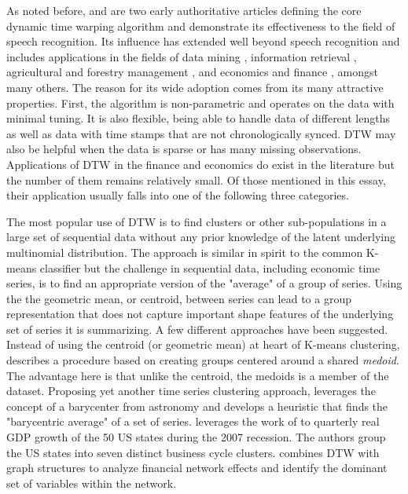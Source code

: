 \documentclass[12pt]{report}
\begin{document}
As noted before, \cite{SakoeChiba_IEEE_1978} and \cite{Itakura_1975} are two early authoritative articles defining the core dynamic time warping algorithm and demonstrate its effectiveness to the field of speech recognition. Its influence has extended well beyond speech recognition and includes applications in the fields of data mining \cite{Berndt1994, ElsingAgon2012, KotsifakosAthitsosPapapetrou_2011}, information retrieval \cite{Mueller2007}, agricultural and forestry management \cite{Chaves_et_all_2021_Brazil_Crop_id, Maus_et_al_2016, NarinO.G.2022URAN, QuXuzhou2023Mmls, XiaoXingyuan2023LCCU}, and economics and finance \cite{9145837_Entropic_DTW_Fin_Networks, Urso_et_al_2021, FrancesWiemann2020, HowardTalisAlexeev_2020, Ito_Sakemoto_2020, Mastroeni_et_al_2021, Raihan2017, WAN2017151, WangXieHanSun2012}, amongst many others. The reason for its wide adoption comes from its many attractive properties. First, the algorithm is non-parametric and operates on the data with minimal tuning. It is also flexible, being able to handle data of different lengths as well as data with time stamps that are not chronologically synced. DTW may also be helpful when the data is sparse or has many missing observations. Applications of DTW in the finance and economics do exist in the literature but the number of them remains relatively small. Of those mentioned in this essay, their application usually falls into one of the following three categories.

The most popular use of DTW is to find clusters or other sub-populations in a large set of sequential data without any prior knowledge of the latent underlying multinomial distribution. The approach is similar in spirit to the common K-means classifier but the challenge in sequential data, including economic time series, is to find an appropriate version of the "average" of a group of series. Using the the geometric mean, or centroid, between series can lead to a group representation that does not capture important shape features of the underlying set of series it is summarizing. A few different approaches have been suggested. Instead of using the centroid (or geometric mean) at heart of K-means clustering, \cite{Urso_et_al_2021} describes a procedure based on creating groups centered around a shared \textit{medoid}. The advantage here is that unlike the centroid, the medoids is a member of the dataset. Proposing yet another time series clustering approach, \cite{PETITJEAN2011678} leverages the concept of a barycenter from astronomy and develops a heuristic that finds the "barycentric average" of a set of series. \cite{FrancesWiemann2020} leverages the work of \cite{PETITJEAN2011678} to quarterly real GDP growth of the 50 US states during the 2007 recession. The authors group the US states into seven distinct business cycle clusters. \cite{9145837_Entropic_DTW_Fin_Networks} combines DTW with graph structures to analyze financial network effects and identify the dominant set of variables within the network.
\end{document}
